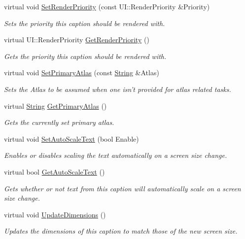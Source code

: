 \begin{DoxyCompactItemize}
virtual void \hyperlink{classphys_1_1UI_1_1Caption_aa822a05b96ca9c61a65b8f366d24a9aa}{SetRenderPriority} (const UI::RenderPriority \&Priority)
\begin{DoxyCompactList}\small\item\em Sets the priority this caption should be rendered with. \item\end{DoxyCompactList}\item 
virtual UI::RenderPriority \hyperlink{classphys_1_1UI_1_1Caption_ada0bf1e830f8f672adbc3263e7095896}{GetRenderPriority} ()
\begin{DoxyCompactList}\small\item\em Gets the priority this caption should be rendered with. \item\end{DoxyCompactList}\item 
virtual void \hyperlink{classphys_1_1UI_1_1Caption_aa4fe1b042c9fed96a4da1b1c9c465071}{SetPrimaryAtlas} (const \hyperlink{namespacephys_aa03900411993de7fbfec4789bc1d392e}{String} \&Atlas)
\begin{DoxyCompactList}\small\item\em Sets the Atlas to be assumed when one isn't provided for atlas related tasks. \item\end{DoxyCompactList}\item 
virtual \hyperlink{namespacephys_aa03900411993de7fbfec4789bc1d392e}{String} \hyperlink{classphys_1_1UI_1_1Caption_a14b5704d66e3a1800f43e49605a9a504}{GetPrimaryAtlas} ()
\begin{DoxyCompactList}\small\item\em Gets the currently set primary atlas. \item\end{DoxyCompactList}\item 
virtual void \hyperlink{classphys_1_1UI_1_1Caption_aee1c527c48cb9789cd28de68ad549393}{SetAutoScaleText} (bool Enable)
\begin{DoxyCompactList}\small\item\em Enables or disables scaling the text automatically on a screen size change. \item\end{DoxyCompactList}\item 
virtual bool \hyperlink{classphys_1_1UI_1_1Caption_a04303c21feae9a3bf4a73fa0fb1176c7}{GetAutoScaleText} ()
\begin{DoxyCompactList}\small\item\em Gets whether or not text from this caption will automatically scale on a screen size change. \item\end{DoxyCompactList}\item 
virtual void \hyperlink{classphys_1_1UI_1_1Caption_a082be5cb2197fdd1cdc06efb410b2e14}{UpdateDimensions} ()
\begin{DoxyCompactList}\small\item\em Updates the dimensions of this caption to match those of the new screen size. \item\end{DoxyCompactList}\end{DoxyCompactItemize}
